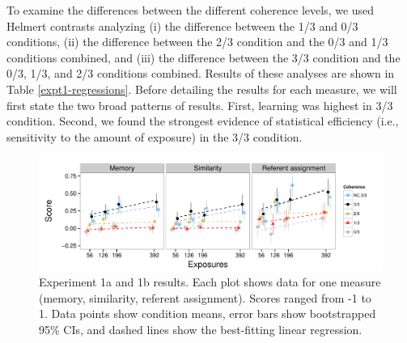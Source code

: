 \documentclass[man,longtable,floatsintext]{my-apa6}
\begin{document}
To examine the differences between the different coherence levels, we used Helmert contrasts analyzing (i) the difference between the 1/3 and 0/3 conditions, (ii) the difference between the 2/3 condition and the 0/3 and 1/3 conditions combined, and (iii) the difference between the 3/3 condition and the 0/3, 1/3, and 2/3 conditions combined. Results of these analyses are shown in Table \ref{expt1-regressions}. Before detailing the results for each measure, we will first state the two broad patterns of results. First, learning was highest in 3/3 condition. Second, we found the strongest evidence of statistical efficiency (i.e., sensitivity to the amount of exposure) in the 3/3 condition.

\begin{figure}[t]
  \begin{center}
    \includegraphics[width=1.0\linewidth]{x1}
    \caption{Experiment 1a and 1b results. Each plot shows data for one measure (memory, similarity, referent assignment). Scores ranged from -1 to 1. Data points show condition means, error bars show bootstrapped 95\% CIs, and dashed lines show the best-fitting linear regression.}
    \label{expt1-results}
  \end{center}
\end{figure}

\newcommand{\ww}{\color{white}{$\enspace$}} \newcommand\T{\rule{0pt}{2.1ex}}
\end{document}

